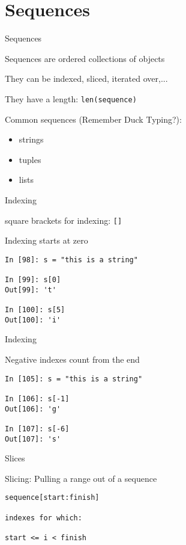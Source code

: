 \documentclass{beamer}
\begin{document}
\section {Sequences}

\begin{frame}[fragile]{Sequences}

{\Large Sequences are ordered collections of objects}

\vfill
{\Large They can be indexed, sliced, iterated over,...}

\vfill
{\Large They have a length:  \verb+len(sequence)+}

\vfill
{\Large Common sequences (Remember Duck Typing?):}

{\Large
\begin{itemize}
   \item strings
   \item tuples
   \item lists
\end{itemize}
}

\end{frame}

\begin{frame}[fragile]{Indexing}

{\Large square brackets for indexing: \verb+[]+}

\vfill
{\Large Indexing starts at zero}

\begin{verbatim}
In [98]: s = "this is a string"

In [99]: s[0]
Out[99]: 't'

In [100]: s[5]
Out[100]: 'i'
\end{verbatim}

\end{frame}

\begin{frame}[fragile]{Indexing}

{\Large Negative indexes count from the end}

\vfill
\begin{verbatim}
In [105]: s = "this is a string"

In [106]: s[-1]
Out[106]: 'g'

In [107]: s[-6]
Out[107]: 's'
\end{verbatim}

\end{frame}

\begin{frame}[fragile]{Slices}

{\Large Slicing: Pulling a range out of a sequence}

\begin{verbatim}
sequence[start:finish]  

indexes for which:

start <= i < finish
\end{verbatim}

\end{frame}
\end{document}
